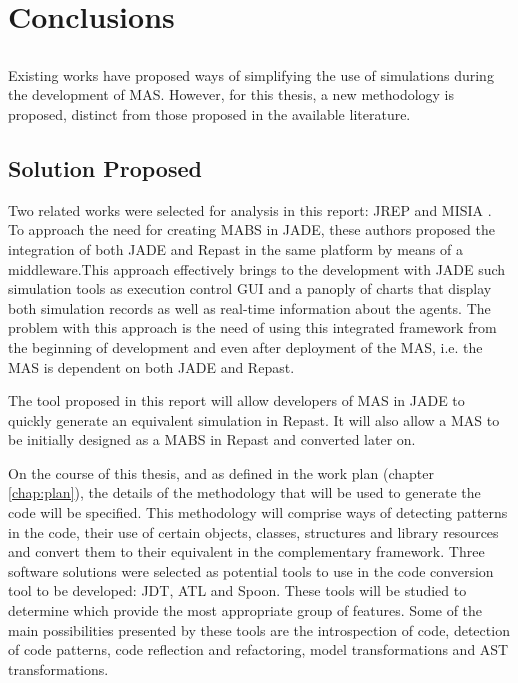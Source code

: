 \chapter{Conclusions} \label{chap:concl}

\section*{}

Existing works have proposed ways of simplifying the use of simulations during the development of MAS. However, for this thesis, a new methodology is proposed, distinct from those proposed in the available literature.

\section{Solution Proposed}
Two related works were selected for analysis in this report: JREP \cite{gormer2011jrep} and MISIA \cite{garcia2011misia}. To approach the need for creating MABS in JADE, these authors proposed the integration of both JADE and Repast in the same platform by means of a middleware.This approach effectively brings to the development with JADE such simulation tools as execution control GUI and a panoply of charts that display both simulation records as well as real-time information about the agents. The problem with this approach is the need of using this integrated framework from the beginning of development and even after deployment of the MAS, i.e. the MAS is dependent on both JADE and Repast.

The tool proposed in this report will allow developers of MAS in JADE to quickly generate an equivalent simulation in Repast. It will also allow a MAS to be initially designed as a MABS in Repast and converted later on.

On the course of this thesis, and as defined in the work plan (chapter \ref{chap:plan}), the details of the methodology that will be used to generate the code will be specified. This methodology will comprise ways of detecting patterns in the code, their use of certain objects, classes, structures and library resources and convert them to their equivalent in the complementary framework. Three software solutions were selected as potential tools to use in the code conversion tool to be developed: JDT, ATL and Spoon. These tools will be studied to determine which provide the most appropriate group of features. Some of the main possibilities presented by these tools are the introspection of code, detection of code patterns, code reflection and refactoring, model transformations and AST transformations.







